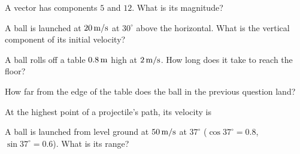 \begin{exo}{}
A vector has components $5$ and $12$. What is its magnitude?
\end{exo}
\begin{exo}{}
A ball is launched at $20\ms$ at $30^\circ$ above the horizontal. What is the vertical component of its initial velocity?
\choices{$17.3\ms$}{$20\ms$}{$10\ms$}{$5\ms$}
\end{exo}
\begin{exo}{}
A ball rolls off a table $0.8\m$ high at $2\,\mathrm{m/s}$. How long does it take to reach the floor?
\choices{$0.4\s$}{$0.16\s$}{$0.8\s$}{$0.2\s$}
\end{exo}
\begin{exo}{}
How far from the edge of the table does the ball in the previous question land?
\choices{$0.4\m$}{$1.6\m$}{$0.2\m$}{$0.8\m$}
\end{exo}
\begin{exo}{}
At the highest point of a projectile's path, its velocity is
\end{exo}
\begin{exo}{}
A ball is launched from level ground at $50\,\mathrm{m/s}$ at $37^\circ$ ($\cos37^\circ=0.8$, $\sin37^\circ=0.6$). What is its range?
\choices{$240\m$}{$300\m$}{$150\m$}{$120\m$}
\end{exo}

